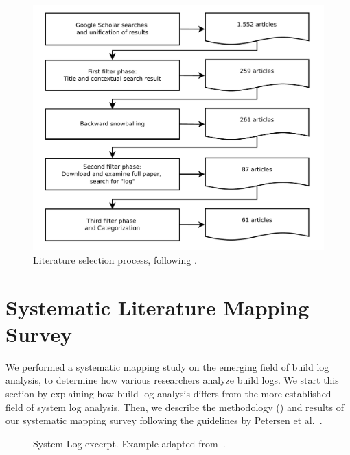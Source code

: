 \begin{figure}[tb]
	\centering
	\includegraphics[width=\columnwidth, clip]{img/lit_survey.pdf}
	\caption{Literature selection process, following
	\cite{petersen2015guidelines}.}
	\label{fig:lit-survey}
\end{figure}

\section{Systematic Literature Mapping Survey}
\label{sec:survey}

We performed a systematic mapping study on the emerging field of
build log analysis,
to determine how various researchers analyze build logs.
We start this section by explaining how build log analysis differs
from the more established field of
system log analysis.
Then, we describe the methodology ()
and results of our systematic mapping
survey following the
guidelines by Petersen et
al.~\cite{petersen2008systematic,petersen2015guidelines}.

\begin{figure}[b]
  \centering
  
  \caption{System Log excerpt.
Example adapted from~\cite{he2017towards}.}
  \label{lst:system-log}
\end{figure}

